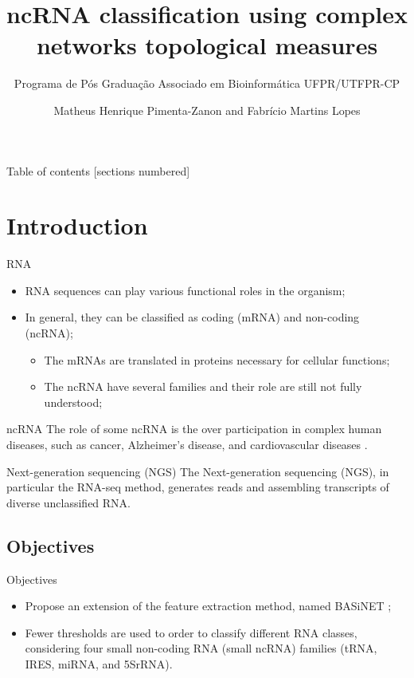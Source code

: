 \documentclass[10pt]{beamer}
\title{ncRNA classification using complex networks topological measures}
\subtitle{Programa de P\'os Gradua\c{c}\~ao Associado em Bioinform\'atica UFPR/UTFPR-CP}
\date{\the\year}
\author{Matheus Henrique Pimenta-Zanon and Fabrício Martins Lopes}
\institute{Universidade Federal do Paraná and Universidade Federal do Paran\'a - Corn\'elio Proc\'opio}
\begin{document}
\maketitle

\begin{frame}{Table of contents}
  [sections numbered]
  \tableofcontents%
\end{frame}

\section[Introduction]{Introduction}

\begin{frame}[fragile]{RNA}

\begin{itemize}
    \item RNA sequences can play various functional roles in the organism;
    \pause
    \item In general, they can be classified as coding (mRNA) and non-coding (ncRNA);
    \pause
    \begin{itemize}
        \item The mRNAs are translated in proteins necessary for cellular functions;
        \pause
        \item The ncRNA have several families and their role are still not fully understood;
    \end{itemize}
\end{itemize}
\end{frame}

\begin{frame}{ncRNA}
    The role of some ncRNA is the over participation in complex human diseases, such as cancer, Alzheimer’s disease, and cardiovascular diseases \cite{Esteller2011, Shi2013}.
\end{frame}

\begin{frame}{Next-generation sequencing (NGS)}
    The Next-generation sequencing (NGS), in particular the RNA-seq method, generates reads and assembling transcripts of diverse unclassified RNA.
\end{frame}


\subsection{Objectives}

\begin{frame}[fragile]{Objectives}
\begin{itemize}
    \item Propose an extension of the feature extraction method, named BASiNET \cite{ito_basinetbiological_2018-1};
    \pause
    \item Fewer thresholds are used to order to classify different RNA classes, considering four small non-coding RNA (small ncRNA) families (tRNA, IRES, miRNA, and 5SrRNA).
\end{itemize}

\end{frame}
\end{document}
